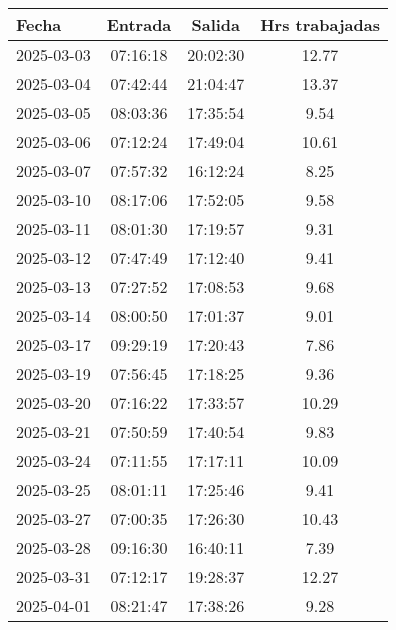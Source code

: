 \documentclass[11pt,a4paper]{article}
\newcommand{\mejoradatabla}[1]{
  \renewcommand{\arraystretch}{1.3}
  \setlength{\tabcolsep}{10pt}
  #1
  \renewcommand{\arraystretch}{1}
  \setlength{\tabcolsep}{6pt}
}
\begin{document}
\begin{minipage}[t]{0.62\textwidth}
\mejoradatabla{
\begin{tabular}{lccc}
\toprule
\rowcolor{grisclaro} \textbf{Fecha} & \textbf{Entrada} & \textbf{Salida} & \textbf{Hrs trabajadas}\\
\midrule

2025-03-03 & 07:16:18 & 20:02:30 & 12.77\\

2025-03-04 & 07:42:44 & 21:04:47 & 13.37\\

2025-03-05 & 08:03:36 & 17:35:54 & 9.54\\

2025-03-06 & 07:12:24 & 17:49:04 & 10.61\\

2025-03-07 & 07:57:32 & 16:12:24 & 8.25\\

2025-03-10 & 08:17:06 & 17:52:05 & 9.58\\

2025-03-11 & 08:01:30 & 17:19:57 & 9.31\\

2025-03-12 & 07:47:49 & 17:12:40 & 9.41\\

2025-03-13 & 07:27:52 & 17:08:53 & 9.68\\

2025-03-14 & 08:00:50 & 17:01:37 & 9.01\\

2025-03-17 & 09:29:19 & 17:20:43 & 7.86\\

2025-03-19 & 07:56:45 & 17:18:25 & 9.36\\

2025-03-20 & 07:16:22 & 17:33:57 & 10.29\\

2025-03-21 & 07:50:59 & 17:40:54 & 9.83\\

2025-03-24 & 07:11:55 & 17:17:11 & 10.09\\

2025-03-25 & 08:01:11 & 17:25:46 & 9.41\\

2025-03-27 & 07:00:35 & 17:26:30 & 10.43\\

2025-03-28 & 09:16:30 & 16:40:11 & 7.39\\

2025-03-31 & 07:12:17 & 19:28:37 & 12.27\\

2025-04-01 & 08:21:47 & 17:38:26 & 9.28\\

\bottomrule
\end{tabular}
}
\end{minipage}
\end{document}
